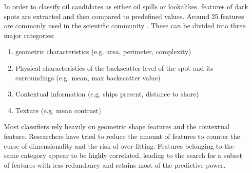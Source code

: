 In order to classify oil candidates as either oil spills or lookalikes, features of dark spots are extracted and then compared to predefined values. Around 25 features are commonly used in the scientific community \cite{Topouzelis200930}. These can be divided into three major categories\cite{Brekke200595}:
\begin{enumerate}
\item geometric characteristics (e.g. area, perimeter, complexity)
\item Physical characteristics of the backscatter level of the spot and its surroundings (e.g. mean, max backscatter value)
\item Contextual information (e.g. ships present, distance to shore)
\item Texture (e.g. mean contrast)
\end{enumerate}
Most classifiers rely heavily on geometric shape features and the contextual feature.\cite{Xu201414} Researchers have tried to reduce the amount of features to counter the curse of dimensionality and the risk of over-fitting. Features belonging to the same category appear to be highly correlated\cite{Xu201414}, leading to the search for a subset of features with less redundancy and retains most of the predictive power\cite{Topouzelis200930}. 
